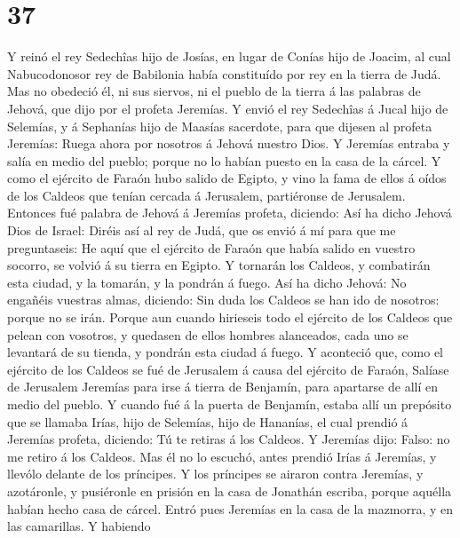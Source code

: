\hypertarget{section-36}{%
\section{37}\label{section-36}}

 Y reinó el rey Sedechîas hijo de Josías, en lugar de Conías
hijo de Joacim, al cual Nabucodonosor rey de Babilonia había constituído
por rey en la tierra de Judá.  Mas no obedeció él, ni sus
siervos, ni el pueblo de la tierra á las palabras de Jehová, que dijo
por el profeta Jeremías.  Y envió el rey Sedechîas á Jucal
hijo de Selemías, y á Sephanías hijo de Maasías sacerdote, para que
dijesen al profeta Jeremías: Ruega ahora por nosotros á Jehová nuestro
Dios.  Y Jeremías entraba y salía en medio del pueblo;
porque no lo habían puesto en la casa de la cárcel.  Y como
el ejército de Faraón hubo salido de Egipto, y vino la fama de ellos á
oídos de los Caldeos que tenían cercada á Jerusalem, partiéronse de
Jerusalem.  Entonces fué palabra de Jehová á Jeremías
profeta, diciendo:  Así ha dicho Jehová Dios de Israel:
Diréis así al rey de Judá, que os envió á mí para que me preguntaseis:
He aquí que el ejército de Faraón que había salido en vuestro socorro,
se volvió á su tierra en Egipto.  Y tornarán los Caldeos, y
combatirán esta ciudad, y la tomarán, y la pondrán á fuego. 
Así ha dicho Jehová: No engañéis vuestras almas, diciendo: Sin duda los
Caldeos se han ido de nosotros: porque no se irán.  Porque
aun cuando hirieseis todo el ejército de los Caldeos que pelean con
vosotros, y quedasen de ellos hombres alanceados, cada uno se levantará
de su tienda, y pondrán esta ciudad á fuego.  Y aconteció
que, como el ejército de los Caldeos se fué de Jerusalem á causa del
ejército de Faraón,  Salíase de Jerusalem Jeremías para
irse á tierra de Benjamín, para apartarse de allí en medio del pueblo.
 Y cuando fué á la puerta de Benjamín, estaba allí un
prepósito que se llamaba Irías, hijo de Selemías, hijo de Hananías, el
cual prendió á Jeremías profeta, diciendo: Tú te retiras á los Caldeos.
 Y Jeremías dijo: Falso: no me retiro á los Caldeos. Mas él
no lo escuchó, antes prendió Irías á Jeremías, y llevólo delante de los
príncipes.  Y los príncipes se airaron contra Jeremías, y
azotáronle, y pusiéronle en prisión en la casa de Jonathán escriba,
porque aquélla habían hecho casa de cárcel.  Entró pues
Jeremías en la casa de la mazmorra, y en las camarillas. Y habiendo

